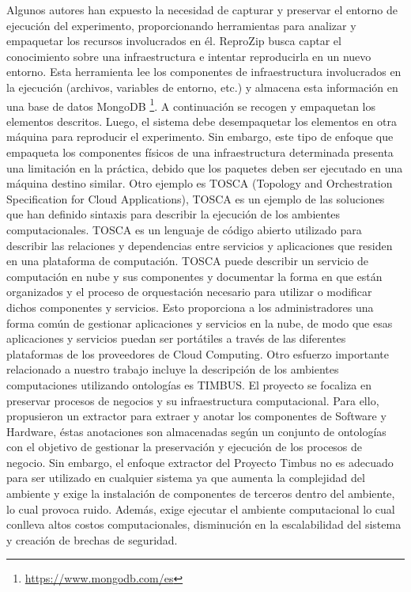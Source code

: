 Algunos autores han expuesto la necesidad de capturar y preservar el entorno de ejecución del experimento, proporcionando herramientas para analizar y empaquetar los recursos involucrados en él.
ReproZip \cite{DBLP:conf/tapp/ChirigatiSF13} busca captar el conocimiento sobre una infraestructura e intentar reproducirla en un nuevo entorno. Esta herramienta lee los componentes de infraestructura involucrados en la ejecución (archivos, variables de entorno, etc.) y almacena esta información en una base de datos MongoDB \footnote{\url{https://www.mongodb.com/es}}. 
A continuación se recogen y empaquetan los elementos descritos. Luego, el sistema debe desempaquetar los elementos en otra máquina para reproducir el experimento. 
Sin embargo, este tipo de enfoque que empaqueta los componentes físicos de una infraestructura determinada presenta una limitación en la práctica, debido que los paquetes deben ser ejecutado en una máquina destino similar.
Otro ejemplo es TOSCA (Topology and Orchestration Specification for Cloud Applications), TOSCA es un ejemplo de las soluciones que han definido sintaxis para describir la ejecución de los ambientes computacionales. TOSCA es un lenguaje de código abierto utilizado para describir las relaciones y dependencias entre servicios y aplicaciones que residen en una plataforma de computación. TOSCA puede describir un servicio de computación en nube y sus componentes y documentar la forma en que están organizados y el proceso de orquestación necesario para utilizar o modificar dichos componentes y servicios. Esto proporciona a los administradores una forma común de gestionar aplicaciones y servicios en la nube, de modo que esas aplicaciones y servicios puedan ser portátiles a través de las diferentes plataformas de los proveedores de Cloud Computing. 
Otro esfuerzo importante relacionado a nuestro trabajo incluye la descripción de los ambientes computaciones utilizando ontologías es TIMBUS. El proyecto se focaliza en preservar procesos de negocios y su infraestructura computacional. 
Para ello, propusieron un extractor para extraer y anotar los componentes de Software y Hardware, éstas anotaciones son almacenadas según un conjunto de ontologías con el objetivo de gestionar la preservación y ejecución de los procesos de negocio. 
Sin embargo, el enfoque extractor del Proyecto Timbus no es adecuado para ser utilizado en cualquier sistema ya que aumenta la complejidad del ambiente y exige la instalación de componentes de terceros dentro del ambiente, lo cual provoca ruido. 
Además, exige ejecutar el ambiente computacional lo cual conlleva altos costos computacionales, disminución en la escalabilidad del sistema y creación de brechas de seguridad. 

